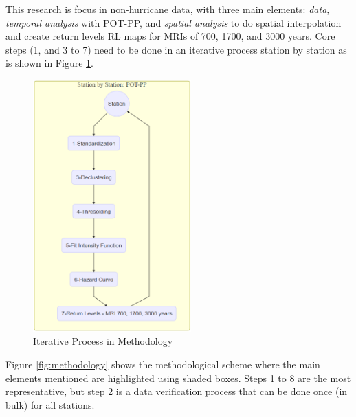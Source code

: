 \documentclass[12pt,oneside]{reedthesis}
\begin{document}
This research is focus in non-hurricane data, with three main elements: \emph{data}, \emph{temporal analysis} with POT-PP, and \emph{spatial analysis} to do spatial interpolation and create return levels RL maps for MRIs of 700, 1700, and 3000 years. Core steps (1, and 3 to 7) need to be done in an iterative process station by station as is shown in Figure \ref{fig:mainmethodology}.
\begin{figure}

{\centering \includegraphics[width=2.4in]{figure/main_methodology} 

}

\caption{Iterative Process in Methodology}\label{fig:mainmethodology}
\end{figure}
Figure \ref{fig:methodology} shows the methodological scheme where the main elements mentioned are highlighted using shaded boxes. Steps 1 to 8 are the most representative, but step 2 is a data verification process that can be done once (in bulk) for all stations.
\end{document}
